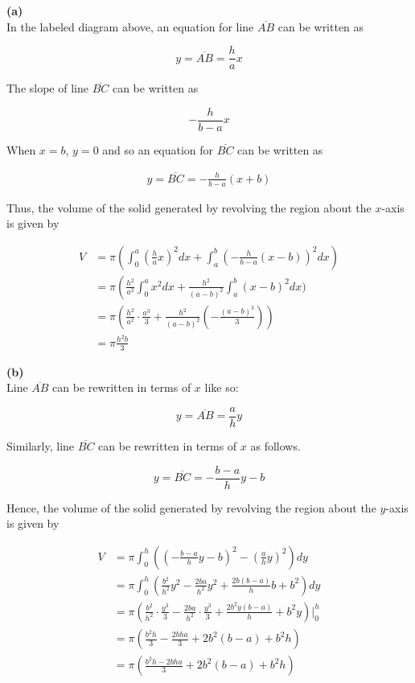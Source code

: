 \documentclass{article}
\begin{document}
    \textbf{(a)} \\
    In the labeled diagram above, an equation for line $\overline{AB}$ can be written as

    \[
        y = \overline{AB} = \frac{h}{a}x
    \]

    The slope of line $\overline{BC}$ can be written as

    \[
        -\frac{h}{b-a}x
    \]

    When $x=b$, $y=0$ and so an equation for $\overline{BC}$ can be written as

    \begin{align*}
        y = \overline{BC} = -\frac{h}{b-a}(x+b)
    \end{align*}

    Thus, the volume of the solid generated by revolving the region about the $x$-axis is given by

    \begin{align*}
        V   &= \pi\left(\int_0^a \left(\frac{h}{a}x\right)^2 dx + \int_a^b \left(-\frac{h}{b-a}(x-b)\right)^2 dx\right) \\
            &= \pi\left(\frac{h^2}{a^2}\int_0^a x^2 dx + \frac{h^2}{(a-b)^2}\int_a^b(x-b)^2 dx) \\
            &= \pi\left(\frac{h^2}{a^2}\cdot\frac{a^3}{3} + \frac{h^2}{(a-b)^2}\left(-\frac{(a-b)^3}{3}\right)\right) \\
            &= \pi\frac{h^2b}{3}
    \end{align*}

    \textbf{(b)} \\
    Line $\overline{AB}$ can be rewritten in terms of $x$ like so:

    \[
        y = \overline{AB} = \frac{a}{h}y
    \]

    Similarly, line $\overline{BC}$ can be rewritten in terms of $x$ as follows.

    \[
        y = \overline{BC} = -\frac{b-a}{h}y-b
    \]

    Hence, the volume of the solid generated by revolving the region about the $y$-axis is given by

    \begin{align*}
        V   &= \pi\int_0^h\left(\left(-\frac{b-a}{h}y-b\right)^2-\left(\frac{a}{h}y\right)^2\right)dy \\
            &= \pi\int_0^h\left(\frac{b^2}{h^2}y^2 - \frac{2ba}{h^2} y^2 + \frac{2b(b-a)}{h}b+b^2\right)dy \\
            &= \pi\left(\frac{b^2}{h^2}\cdot\frac{y^3}{3} - \frac{2ba}{h^2}\cdot\frac{y^3}{3} + \frac{2b^2 y (b-a)}{h} + b^2 y\right)\Big|_0^h \\
            &= \pi\left(\frac{b^2 h}{3} - \frac{2bha}{3} + 2b^2 (b-a)+b^2 h\right) \\
            &= \pi\left(\frac{b^2 h - 2bha}{3} + 2b^2 (b-a) + b^2 h\right)
    \end{align*}
\end{document}
